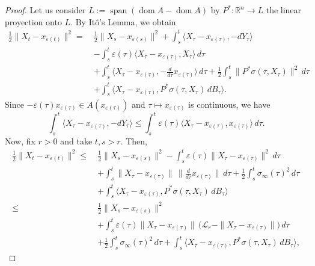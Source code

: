\documentclass[10pt,a4paper]{amsart}
\newcommand{\R}{\mathbb{R}}
\newcommand{\dom}{\operatorname{dom}}
\renewcommand{\epsilon}{\varepsilon}
\begin{document}
\begin{proof} 
Let us consider  $L:=\operatorname{span}(\dom A  - \dom A)$  by $P^\ast \colon \R^n \to L$ the linear proyection onto $L$. By Itô's Lemma, we obtain
	\begin{equation*}
		\begin{aligned}
			\frac{1}{2}\|X_t-x_{\epsilon(t)}\|^2
			= \ &\frac{1}{2}\|X_s-x_{\epsilon(s)}\|^2 
			+ \int_s^t \langle X_\tau-x_{\epsilon(\tau)},-dY_\tau\rangle \\
			&- \int_s^t \epsilon(\tau)\langle X_\tau-x_{\epsilon(\tau)},X_\tau\rangle \,d\tau \\
			&+ \int_s^t \langle X_\tau-x_{\epsilon(\tau)},-\frac{d}{d\tau}x_{\epsilon(\tau)}\rangle\, d\tau 
			+ \frac{1}{2}\int_s^t \|P^\ast\sigma(\tau,X_\tau)\|^2 \, d\tau \\
			&+ \int_s^t \langle X_\tau-x_{\epsilon(\tau)},P^\ast\sigma(\tau,X_\tau)\, dB_\tau \rangle.
		\end{aligned}
	\end{equation*}
	Since $-\epsilon(\tau)x_{\epsilon(\tau)}\in A(x_{\epsilon(\tau)})$ and $\tau\mapsto x_{\epsilon(\tau)}$ is continuous, we have
	\begin{equation*}
		\int_s^t \langle X_\tau-x_{\epsilon(\tau)},-dY_\tau\rangle
		\leq \int_s^t \epsilon(\tau)\langle X_\tau-x_{\epsilon(\tau)},x_{\epsilon(\tau)}\rangle \, d\tau.
	\end{equation*}
	Now, fix $r >0$ and take $t,s >r$. Then,
	\begin{equation*}
		\begin{aligned}
			\frac{1}{2}\|X_t-x_{\epsilon(t)}\|^2
			\leq \ &\frac{1}{2}\|X_s-x_{\epsilon(s)}\|^2 
			-\int_s^t \epsilon(\tau)\|X_\tau-x_{\epsilon(\tau)}\|^2 \, d\tau \\
			&+ \int_s^t \|X_\tau-x_{\epsilon(\tau)}\|\,
			\Big\|\frac{d}{d\tau}x_{\epsilon(\tau)}\Big\| \, d\tau
			+ \frac{1}{2}\int_s^t \sigma_\infty(\tau)^2 \, d\tau \\
			&+ \int_s^t \langle X_\tau-x_{\epsilon(\tau)},P^\ast\sigma(\tau,X_\tau)\, dB_\tau \rangle \\
			\leq \ &\frac{1}{2}\|X_s-x_{\epsilon(s)}\|^2 \\
			&+ \int_s^t \epsilon(\tau)\|X_\tau-x_{\epsilon(\tau)}\|\,
			\big(\mathcal{L}_{r}-\|X_\tau-x_{\epsilon(\tau)}\|\big) \, d\tau \\
			&+ \frac{1}{2}\int_s^t \sigma_\infty(\tau)^2 \, d\tau
			+ \int_s^t \langle X_\tau-x_{\epsilon(\tau)},P^\ast\sigma(\tau,X_\tau)\, dB_\tau \rangle,
		\end{aligned}

\end{equation*}
\end{proof}
\end{document}
